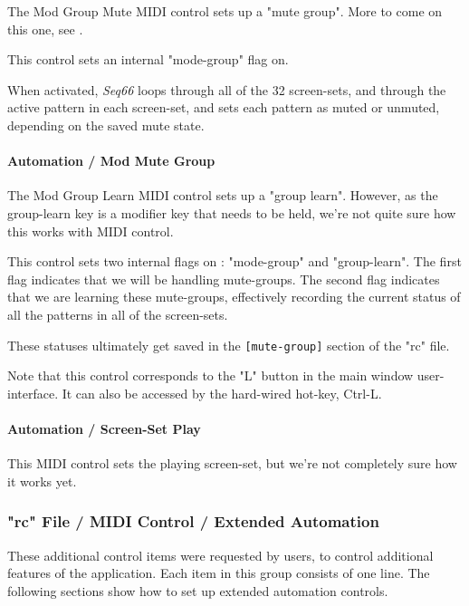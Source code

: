    The Mod Group Mute MIDI control sets up a "mute group".
   More to come on this one,
   see .

   This control sets an internal "mode-group" flag on.

   When activated, \textsl{Seq66} loops through all of the 32
   screen-sets, and through the active pattern in each screen-set, and
   sets each pattern as muted or unmuted, depending on the saved mute state.

\paragraph{Automation / Mod Mute Group}
\label{paragraph:rc_file_midi_ctrl_modgmute}

   The Mod Group Learn MIDI control sets up a "group learn".
   However, as the group-learn key is a modifier key that needs to
   be held, we're not quite sure how this works with MIDI control.

   This control sets two internal flags on : "mode-group" and "group-learn".
   The first flag indicates that we will be handling mute-groups.
   The second flag indicates that we are learning these mute-groups,
   effectively recording the current status of all the patterns in all of the
   screen-sets.

   These statuses ultimately get saved in the \texttt{[mute-group]} section of
   the "rc" file.

   Note that this control corresponds to the "L" button in the main window
   user-interface.
   It can also be accessed by the hard-wired hot-key, Ctrl-L.

\paragraph{Automation / Screen-Set Play}
\label{paragraph:rc_file_midi_ctrl_ssplay}

This MIDI control sets the playing screen-set, 
but we're not completely sure how it works yet.

\subsubsection{"rc" File / MIDI Control / Extended Automation}
\label{subsubsec:rc_file_midi_ctrl_automationex}

   These additional control items were requested by users, to control
   additional features of the application.
   Each item in this group consists of one line.
   The following sections show how to set up extended automation controls.

